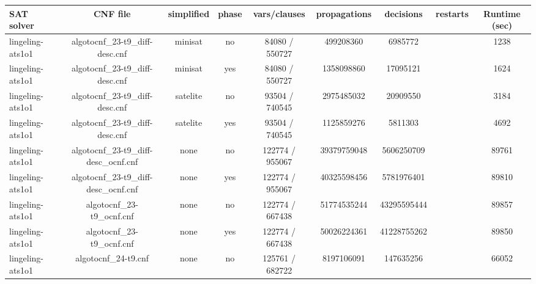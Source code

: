 \begin{appendices}
\begin{table}[p]
  \begin{center}
    \begin{tabular}{l|cccccccc}
        \textbf{SAT solver} & \textbf{CNF file} & \textbf{simplified} & \textbf{phase} & \textbf{vars/clauses} & \textbf{propagations} & \textbf{decisions} & \textbf{restarts} & \textbf{Runtime (sec)} \\
      \hline
  lingeling-ats1o1               & algotocnf\_23-t9\_diff-desc.cnf & minisat    & no    & 84080 / 550727 & 499208360 & 6985772   &            & 1238 \\ %
  lingeling-ats1o1               & algotocnf\_23-t9\_diff-desc.cnf & minisat    & yes   & 84080 / 550727 & 1358098860 & 17095121  &            & 1624 \\ %
  lingeling-ats1o1               & algotocnf\_23-t9\_diff-desc.cnf & satelite   & no    & 93504 / 740545 & 2975485032 & 20909550  &            & 3184 \\ %
  lingeling-ats1o1               & algotocnf\_23-t9\_diff-desc.cnf & satelite   & yes   & 93504 / 740545 & 1125859276 & 5811303   &            & 4692 \\ %
  lingeling-ats1o1               & algotocnf\_23-t9\_diff-desc\_ocnf.cnf & none       & no    & 122774 / 955067 & 39379759048 & 5606250709 &            & 89761 \\ %
  lingeling-ats1o1               & algotocnf\_23-t9\_diff-desc\_ocnf.cnf & none       & yes   & 122774 / 955067 & 40325598456 & 5781976401 &            & 89810 \\ %
  lingeling-ats1o1               & algotocnf\_23-t9\_ocnf.cnf     & none       & no    & 122774 / 667438 & 51774535244 & 43295595444 &            & 89857 \\ %
  lingeling-ats1o1               & algotocnf\_23-t9\_ocnf.cnf     & none       & yes   & 122774 / 667438 & 50026224361 & 41228755262 &            & 89850 \\ %
  lingeling-ats1o1               & algotocnf\_24-t9.cnf           & none       & no    & 125761 / 682722 & 8197106091 & 147635256 &            & 66052 \\ %

\end{tabular}
\end{center}
\end{table}
\end{appendices}
